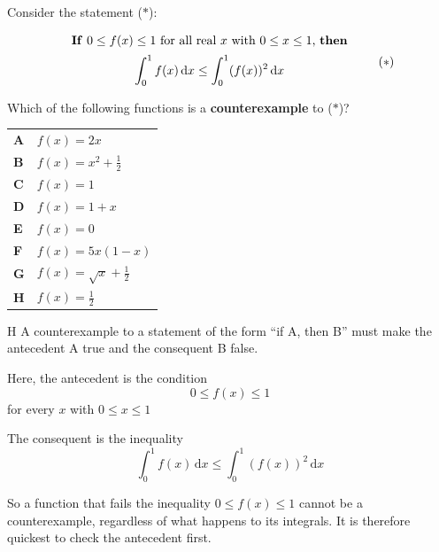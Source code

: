 \documentclass[11pt,a4paper]{article}
\begin{document}
\begin{enumerate}[label=\textbf{\arabic*.},leftmargin=*,itemsep=0pt,start=9]
\questionitem[Logic]
Consider the statement ($\ast$):

\[ \begin{array}{c}
\text{\textbf{If} $0 \le f(x) \le 1$ for all real $x$ with $0 \le x \le 1$, \textbf{then}}\\[5pt]

\text{$\displaystyle\int_0^1 f(x)\,\mathrm{d}x \le \int_0^1 (f(x))^2\,\mathrm{d}x$} \\[10pt]
\end{array} \tag{$\ast$} \] Which of the following functions is a \textbf{counterexample} to ($\ast$)?

\par\vspace*{12pt}
\begin{tabularx}{\linewidth}{@{}>{\bfseries}l Y@{}}
A &
$f(x)=2x$
\\[0.8em]
B &
$f(x)=x^2+\frac{1}{2}$
\\[0.8em]
C &
$f(x)=1$
\\[0.8em]
D &
$f(x)=1+x$
\\[0.8em]
E &
$f(x)=0$
\\[0.8em]
F &
$f(x)=5x(1-x)$
\\[0.8em]
G &
$f(x)=\sqrt{x}+\frac{1}{2}$
\\[0.8em]
H &
$f(x)=\frac12$
\\
\end{tabularx}

\begin{djsSolution}{H}
A counterexample to a statement of the form ``if A, then B'' must make the antecedent A true and the consequent B false.

Here, the antecedent is the condition
\[
0\leq f(x)\leq1
\]
for every \(x\) with \(0\leq x\leq1\)

The consequent is the inequality
\[
\int_0^1 f(x)\,\mathrm{d}x
\leq
\int_0^1 (f(x))^2\,\mathrm{d}x
\]

So a function that fails the inequality \(0\leq f(x)\leq1\) cannot be a counterexample, regardless of what happens to its integrals. It is therefore quickest to check the antecedent first.


\end{djsSolution}
\end{enumerate}
\end{document}
